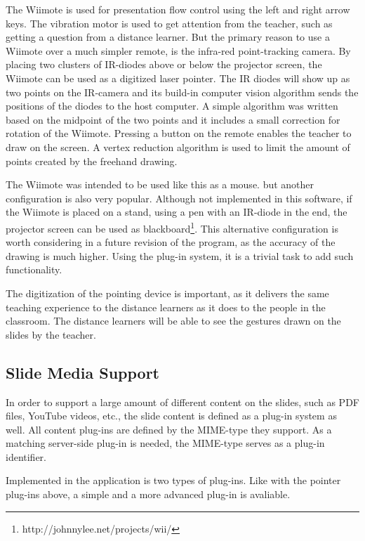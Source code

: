 \documentclass[a4paper,12pt]{article}
\begin{document}
The Wiimote is used for presentation flow control using the left and right arrow keys. The vibration motor is used to get attention from the teacher, such as getting a question from a distance learner. But the primary reason to use a Wiimote over a much simpler remote, is the infra-red point-tracking camera. By placing two clusters of IR-diodes above or below the projector screen, the Wiimote can be used as a digitized laser pointer. The IR diodes will show up as two points on the IR-camera and its build-in computer vision algorithm sends the positions of the diodes to the host computer. A simple algorithm was written based on the midpoint of the two points and it includes a small correction for rotation of the Wiimote. Pressing a button on the remote enables the teacher to draw on the screen. A vertex reduction algorithm is used to limit the amount of points created by the freehand drawing. 

The Wiimote was intended to be used like this as a mouse. but another configuration is also very popular. Although not implemented in this software, if the Wiimote is placed on a stand, using a pen with an IR-diode in the end, the projector screen can be used as blackboard\footnote{http://johnnylee.net/projects/wii/}. This alternative configuration is worth considering in a future revision of the program, as the accuracy of the drawing is much higher. Using the plug-in system, it is a trivial task to add such functionality.

The digitization of the pointing device is important, as it delivers the same teaching experience to the distance learners as it does to the people in the classroom. The distance learners will be able to see the gestures drawn on the slides by the teacher.

\subsection{Slide Media Support}

In order to support a large amount of different content on the slides, such as PDF files, YouTube videos, etc., the slide content is defined as a plug-in system as well. All content plug-ins are defined by the MIME-type they support. As a matching server-side plug-in is needed, the MIME-type serves as a plug-in identifier.

Implemented in the application is two types of plug-ins. Like with the pointer plug-ins above, a simple and a more advanced plug-in is avaliable.
\\
\end{document}

